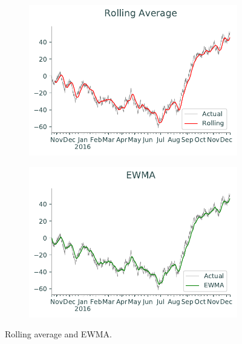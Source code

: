 \begin{figure}[H] %
\captionsetup[subfigure]{justification=centering}
\centering
\begin{subfigure}{.49\textwidth}
    \centering
    \includegraphics[width=\textwidth]{figures/moving_rolling.pdf}
    \caption{}
    \label{fig:pandas-ts-moving-rolling}
\end{subfigure}
%
\begin{subfigure}{.49\textwidth}
    \centering
    \includegraphics[width=\textwidth]{figures/moving_ewma.pdf}
    \caption{}
    \label{fig:pandas-ts-moving-ewma}
\end{subfigure}
\caption{Rolling average and EWMA.}
\end{figure}

